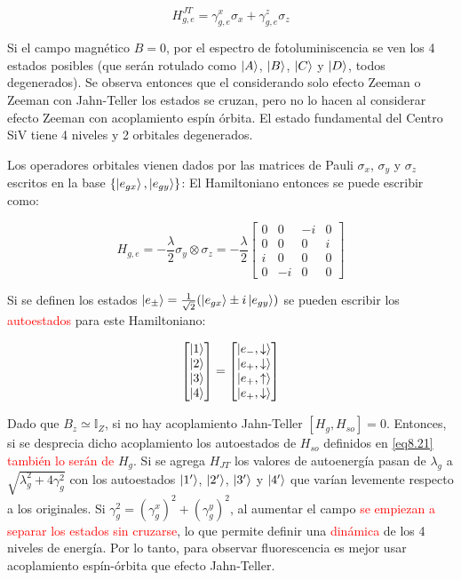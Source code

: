 \documentclass{book}
\begin{document}
\begin{equation}\label{eq8.19}H_{g,e}^{JT}=\gamma_{g,e}^x\sigma_x+\gamma_{g,e}^z\sigma_z\end{equation}

Si el campo magnético $B=0$, por el espectro de fotoluminiscencia se ven los 4 estados posibles (que serán rotulado como $\ket{A}$, $\ket{B}$, $\ket{C}$ y $\ket{D}$, todos degenerados). Se observa entonces que el considerando solo efecto Zeeman o Zeeman con Jahn-Teller los estados se cruzan, pero no lo hacen al considerar efecto Zeeman con acoplamiento espín órbita. El estado fundamental del Centro SiV tiene 4 niveles y 2 orbitales degenerados. 

Los operadores orbitales vienen dados por las matrices de Pauli $\sigma_x$, $\sigma_y$ y $\sigma_z$ escritos en la base $\{\ket{e_{gx}},\ket{e_{gy}}\}$: El Hamiltoniano entonces se puede escribir como:

\begin{equation}\label{eq8.20}H_{g,e}=-\frac{\lambda}{2}\sigma_y\otimes\sigma_z=-\frac{\lambda}{2}\begin{bmatrix}0&0&-i&0\\0&0&0&i\\i&0&0&0\\0&-i&0&0\end{bmatrix}\end{equation}

Si se definen los estados $\ket{e_\pm}=\frac{1}{\sqrt{2}}(\ket{e_{gx}}\pm i\ket{e_{gy}})$ se pueden escribir los \textcolor{red}{autoestados} para este Hamiltoniano:

\begin{equation}\label{eq8.21}\begin{bmatrix}\ket{1}\\\ket{2}\\\ket{3}\\\ket{4}\end{bmatrix}=\begin{bmatrix}\ket{e_-,\downarrow}\\\ket{e_+,\downarrow}\\\ket{e_+,\uparrow}\\\ket{e_+,\downarrow}\end{bmatrix}\end{equation}

Dado que $B_z\simeq\mathbb{I}_Z$, si no hay acoplamiento Jahn-Teller $[H_g,H_{so}]=0$. Entonces, si se desprecia dicho acoplamiento los autoestados de $H_{so}$ definidos en \ref{eq8.21} \textcolor{red}{también lo serán de} $H_g$. Si se agrega $H_{JT}$ los valores de autoenergía pasan de $\lambda_g$ a $\sqrt{\lambda_g^2+4\gamma_g^2}$ con los autoestados $\ket{1^\prime}$, $\ket{2^\prime}$, $\ket{3^\prime}$ y $\ket{4^\prime}$ que varían levemente respecto a los originales. Si $\gamma_g^2=(\gamma_g^x)^2+(\gamma_g^y)^2$, al aumentar el campo \textcolor{red}{se empiezan a separar los estados sin cruzarse}, lo que permite definir una \textcolor{red}{dinámica} de los 4 niveles de energía. Por lo tanto, para observar fluorescencia es mejor usar acoplamiento espín-órbita que efecto Jahn-Teller.
\end{document}
